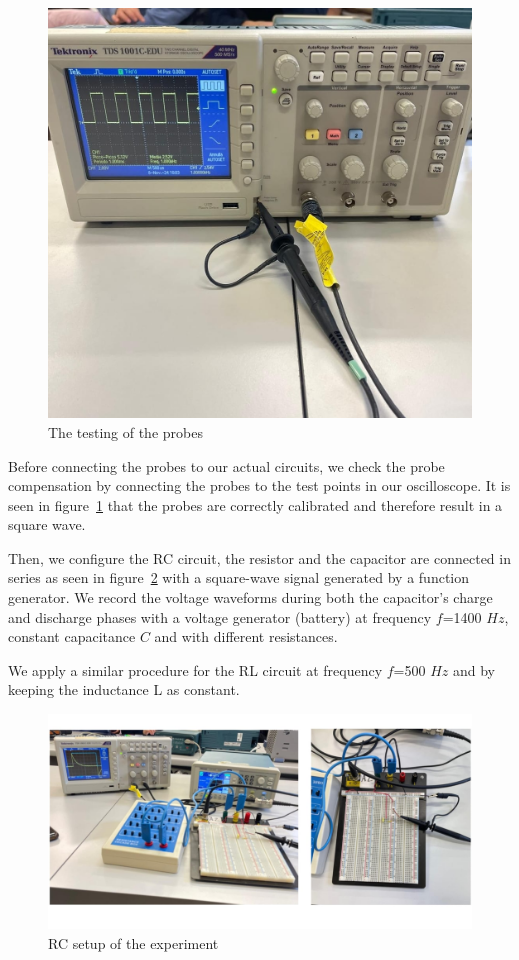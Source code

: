 \documentclass[notitlepage]{report}
\numberwithin{equation}{section}
\theoremstyle{plain}
\theoremstyle{definition}
\theoremstyle{remark}
\begin{document}
\begin{figure}
    \centering
    \includegraphics[width=0.5\linewidth]{figures/probes_test.jpeg}
    \caption{The testing of the probes}
    \label{fig:probes_test}
\end{figure}


Before connecting the probes to our actual circuits, we check the probe compensation by connecting the probes to the test points in our oscilloscope. It is seen in figure~\ref{fig:probes_test} that the probes are correctly calibrated and therefore result in a square wave.

Then, we configure the RC circuit, the resistor and the capacitor are connected in series as seen in figure~\ref{fig:setup-rc} with a square-wave signal generated by a function generator. We record the voltage waveforms during both the capacitor’s charge and discharge phases with a voltage generator (battery) at frequency  \( f \)=1400 \( Hz \), constant capacitance \(C\) and with different resistances.

We apply a similar procedure for the RL circuit at frequency \( f \)=500 \( Hz \) and by keeping the inductance L as constant.


\begin{figure}
    \centering
    \includegraphics[width=1\linewidth]{figures/RC_pictures.jpeg}
    \caption{RC setup of the experiment}
    \label{fig:setup-rc}
\end{figure}
\end{document}
